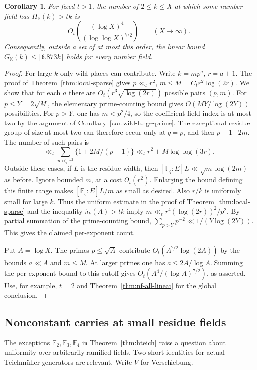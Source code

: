 \documentclass[11pt,letterpaper]{article}
\newtheorem{corollary}[corollary]{Corollary}
\theoremstyle{definition}
\numberwithin{equation}{section}
\begin{document}
\begin{corollary}\label{cor:absolute-sparse-count}
For fixed $t>1$, the number of $2\le k\le X$ at which some number
field has $H_{\mathbb K}(k)>t k$ is
\[
           O_t\!\left(\frac{(\log X)^4}{(\log\log X)^{7/2}}\right)
                       \qquad(X\longrightarrow\infty).
\]
Consequently, outside a set of at most this order, the linear bound
$G_{\mathbb K}(k)\le\lfloor6.873k\rfloor$ holds for every number field.
\end{corollary}
\begin{proof}
For large $k$ only wild places can contribute. Write $k=mp^a$,
$r=a+1$. The proof of Theorem~\ref{thm:local-sparse} gives
$p\ll_t r^2$, $m\le M=C_t r^2\log(2r)$. We show that for each
$a$ there are $O_t(r^3\sqrt{\log(2r)})$ possible pairs $(p,m)$.
For $p\le Y=2\sqrt M$, the elementary prime-counting bound gives
$O(MY/\log(2Y))$ possibilities. For $p>Y$, one has $m<p^2/4$,
so the coefficient-field index is at most two by the argument of
Corollary~\ref{cor:wild-large-prime}. The exceptional residue group
of size at most two can therefore occur only at $q=p$, and then
$p-1\mid 2m$. The number of such pairs is
\[
 \ll_t\sum_{p\ll_t r^2}\{1+2M/(p-1)\}
       \ll_t r^2+M\log\log(3r).
\]
Outside these cases, if $L$ is the residue width, then
$[\mathbb F_q:E]L\ll\sqrt m\log(2m)$ as before. Ignore bounded $m$,
at a cost $O_t(r^2)$. Enlarging the bound defining this finite range
makes $[\mathbb F_q:E]L/m$ as small as desired. Also $r/k$ is
uniformly small for large $k$. Thus the uniform estimate
in the proof of Theorem~\ref{thm:local-sparse} and the inequality
$h_k(A)>tk$ imply $m\ll_t r^4(\log(2r))^2/p^2$.
By partial summation of the prime-counting bound,
$\sum_{p>Y}p^{-2}\ll1/(Y\log(2Y))$. This gives the claimed
per-exponent count.

Put $A=\log X$. The primes $p\le\sqrt A$ contribute
$O_t(A^{7/2}\log(2A))$ by the bounds $a\ll A$ and $m\le M$.
At larger primes one has $a\le2A/\log A$. Summing the per-exponent
bound to this cutoff gives $O_t(A^4/(\log A)^{7/2})$, as asserted.
Use, for example, $t=2$ and Theorem~\ref{thm:nf-all-linear} for the
global conclusion.
\end{proof}

\subsection{Nonconstant carries at small residue fields}
\label{sec:local-small-carries}
The exceptions $\mathbb F_2,\mathbb F_3,\mathbb F_4$ in
Theorem~\ref{thm:hteich} raise a question about uniformity over
arbitrarily ramified fields. Two short identities for actual
Teichm\"uller generators are relevant. Write $V$ for Verschiebung.
\end{document}
